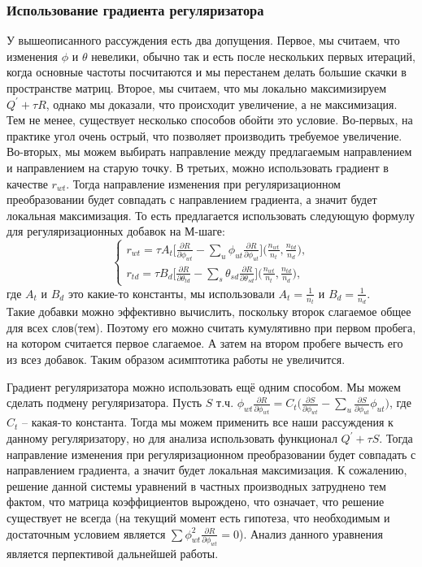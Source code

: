 \documentclass[12pt]{article}
\begin{document}
\subsubsection{Использование градиента регуляризатора}
У вышеописанного рассуждения есть два допущения. Первое, мы считаем, что изменения $\phi$ и $\theta$ невелики, обычно так и есть после нескольких первых итераций, когда основные частоты посчитаются и мы  перестанем делать большие скачки в пространстве матриц. Второе, мы считаем, что мы локально максимизируем $Q^{\prime} + \tau R$, однако мы доказали, что происходит увеличение, а не максимизация. Тем не менее, существует несколько способов обойти это условие. Во-первых, на практике угол очень острый, что позволяет производить требуемое увеличение. Во-вторых, мы можем выбирать направление между предлагаемым направлением и направлением на старую точку. В третьих, можно использовать градиент в качестве $r_{wt}$. Тогда направление изменения при регуляризационном преобразовании будет совпадать с направлением градиента, а значит будет локальная максимизация. То есть предлагается использовать следующую формулу для регуляризационных добавок на М-шаге:
\[
\left\{
	\begin{aligned}
		r_{wt} = \tau A_t \bigg[{\frac{\partial{R}}{\partial{\phi_{wt}}} - \sum\limits_u \phi_{ut} \frac{\partial{R}}{\partial{\phi_{ut}}} }\bigg] \bigg(\frac{n_{wt}}{n_t}, \frac{n_{td}}{n_d}\bigg),\\
		r_{td} = \tau B_d \bigg[ {\frac{\partial{R}}{\partial{\theta_{td}}} - \sum\limits_s \theta_{sd} \frac{\partial{R}}{\partial{\theta_{sd}}} }\bigg] \bigg(\frac{n_{wt}}{n_t}, \frac{n_{td}}{n_d}\bigg) ,
	\end{aligned}
\right.
\]
где $A_t$ и $B_d$ это какие-то константы, мы использовали $A_t = \frac{1}{n_t}$ и $B_d = \frac{1}{n_d}$.\\
Такие добавки можно эффективно вычислить, поскольку второк слагаемое общее для всех слов(тем). Поэтому его можно считать кумулятивно при первом пробега, на котором считается первое слагаемое. А затем на втором пробеге вычесть его из всез добавок. Таким образом асимптотика работы не увеличится. 

Градиент регуляризатора можно использовать ещё одним способом. Мы можем сделать подмену регуляризатора. Пусть $S$ т.ч. $\phi_{wt}\frac{\partial{R}}{\partial{\phi_{wt}}} = C_t \bigg( \frac{\partial{S}}{\partial{\phi_{wt}}} - \sum_{u}  \frac{\partial{S}}{\partial{\phi_{ut}}} \phi_{ut} \bigg)$, где $C_t$ -- какая-то константа. Тогда мы можем применить все наши рассуждения к данному регуляризатору, но для анализа использовать функционал $Q^{\prime} + \tau S$. Тогда направление изменения при регуляризационном преобразовании будет совпадать с направлением градиента, а значит будет локальная максимизация. К сожалению, решение данной системы уравнений в частных производных затруднено тем фактом, что матрица коэффициентов вырождено, что означает, что решение существует не всегда (на текущий момент есть гипотеза, что необходимым и достаточным условием является $\sum \phi_{wt}^2 \frac{\partial{R}}{\partial{\phi_{wt}}} = 0$). Анализ данного уравнения является перпективой дальнейшей работы.
\end{document}
